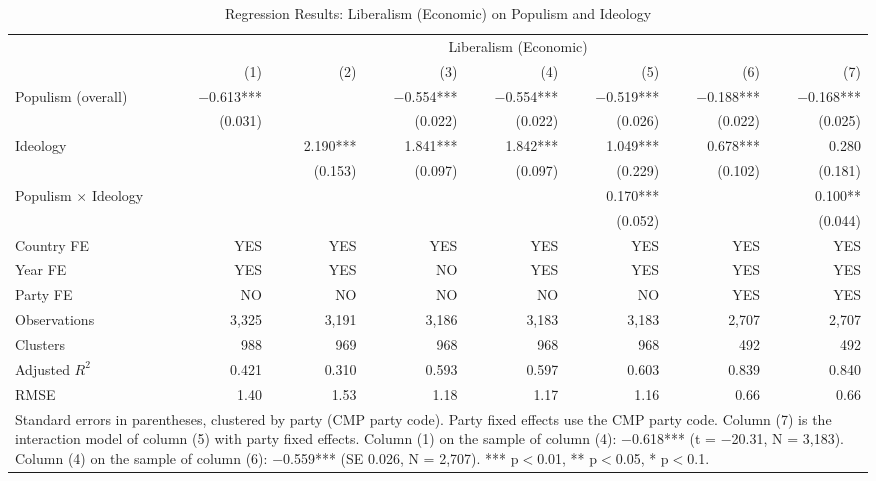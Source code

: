 \begin{table}
\caption{Regression Results: Liberalism (Economic) on Populism and Ideology}
\label{tab:7}
\scriptsize\setlength{\tabcolsep}{4pt}
\centering
\begin{tabular}{lrrrrrrr}
\toprule
 & \multicolumn{7}{c}{Liberalism (Economic)} \\
 & (1) & (2) & (3) & (4) & (5) & (6) & (7) \\
 \midrule
Populism (overall) & $-$0.613*** &  & $-$0.554*** & $-$0.554*** & $-$0.519*** & $-$0.188*** & $-$0.168*** \\
& (0.031) &  & (0.022) & (0.022) & (0.026) & (0.022) & (0.025) \\
Ideology &  & 2.190*** & 1.841*** & 1.842*** & 1.049*** & 0.678*** & 0.280 \\
&  & (0.153) & (0.097) & (0.097) & (0.229) & (0.102) & (0.181) \\
Populism $\times$ Ideology &  &  &  &  & 0.170*** &  & 0.100** \\
&  &  &  &  & (0.052) &  & (0.044) \\
\midrule
Country FE & YES & YES & YES & YES & YES & YES & YES\\
Year FE & YES & YES & NO & YES & YES & YES & YES\\
Party FE & NO & NO & NO & NO & NO & YES & YES\\
Observations & 3,325 & 3,191 & 3,186 & 3,183 & 3,183 & 2,707 & 2,707 \\
Clusters & 988 & 969 & 968 & 968 & 968 & 492 & 492 \\
Adjusted $R^2$ & 0.421 & 0.310 & 0.593 & 0.597 & 0.603 & 0.839 & 0.840 \\
RMSE & 1.40 & 1.53 & 1.18 & 1.17 & 1.16 & 0.66 & 0.66 \\
\bottomrule
\multicolumn{8}{p{0.9\linewidth}}{\scriptsize Standard errors in parentheses, clustered by party (CMP party code). Party fixed effects use the CMP party code. Column (7) is the interaction model of column (5) with party fixed effects. Column (1) on the sample of column (4): $-$0.618*** (t = $-$20.31, N = 3,183). Column (4) on the sample of column (6): $-$0.559*** (SE 0.026, N = 2,707). *** p$<$0.01, ** p$<$0.05, * p$<$0.1.} \\
\end{tabular}
\end{table}
